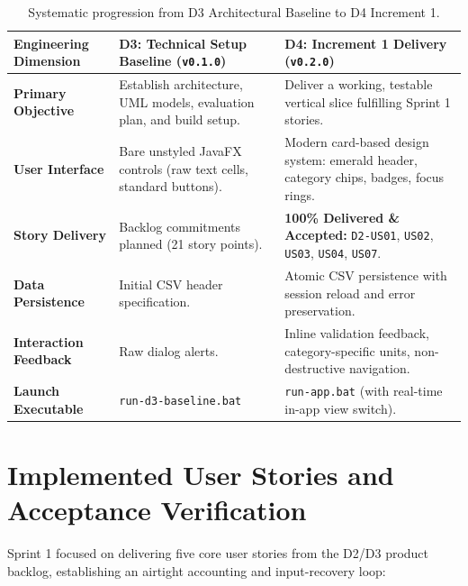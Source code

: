 \documentclass[12pt,a4paper]{article}
\newcommand{\code}[1]{\texttt{#1}}
\begin{document}
\begin{table}[h!]
\centering
\small
\begin{tabularx}{\textwidth}{lXX}
\toprule
\textbf{Engineering Dimension} & \textbf{D3: Technical Setup Baseline (\code{v0.1.0})} & \textbf{D4: Increment 1 Delivery (\code{v0.2.0})} \\
\midrule
\textbf{Primary Objective} & Establish architecture, UML models, evaluation plan, and build setup. & Deliver a working, testable vertical slice fulfilling Sprint 1 stories. \\
\textbf{User Interface} & Bare unstyled JavaFX controls (raw text cells, standard buttons). & Modern card-based design system: emerald header, category chips, badges, focus rings. \\
\textbf{Story Delivery} & Backlog commitments planned (21 story points). & \textbf{100\% Delivered \& Accepted:} \code{D2-US01}, \code{US02}, \code{US03}, \code{US04}, \code{US07}. \\
\textbf{Data Persistence} & Initial CSV header specification. & Atomic CSV persistence with session reload and error preservation. \\
\textbf{Interaction Feedback} & Raw dialog alerts. & Inline validation feedback, category-specific units, non-destructive navigation. \\
\textbf{Launch Executable} & \code{run-d3-baseline.bat} & \code{run-app.bat} (with real-time in-app view switch). \\
\bottomrule
\end{tabularx}
\caption{Systematic progression from D3 Architectural Baseline to D4 Increment 1.}
\label{tab:progression}
\end{table}

\section{Implemented User Stories and Acceptance Verification}

Sprint 1 focused on delivering five core user stories from the D2/D3 product backlog, establishing an airtight accounting and input-recovery loop:
\end{document}
